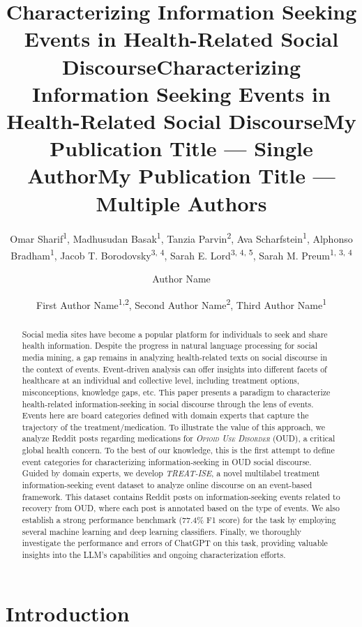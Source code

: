 \documentclass[letterpaper]{article} %
\title{Characterizing Information Seeking Events in Health-Related Social Discourse}
\title{Characterizing Information Seeking Events in Health-Related Social Discourse}
\author {
    Omar Sharif\textsuperscript{\rm 1},
    Madhusudan Basak\textsuperscript{\rm1},
    Tanzia Parvin\textsuperscript{\rm 2},
    Ava Scharfstein\textsuperscript{\rm 1},
    Alphonso Bradham\textsuperscript{\rm 1},
    Jacob T. Borodovsky\textsuperscript{\rm 3, \rm 4},
    Sarah E. Lord\textsuperscript{\rm 3, \rm 4, \rm 5},
    Sarah M. Preum\textsuperscript{\rm 1, \rm 3, \rm 4}
}
\title{My Publication Title --- Single Author}
\author {
    Author Name
}
\title{My Publication Title --- Multiple Authors}
\author {
    First Author Name\textsuperscript{\rm 1,\rm 2},
    Second Author Name\textsuperscript{\rm 2},
    Third Author Name\textsuperscript{\rm 1}
}
\begin{document}
\maketitle

\begin{abstract}
Social media sites have become a popular platform for individuals to seek and share health information. Despite the progress in natural language processing for social media mining, a gap remains in analyzing health-related texts on social discourse in the context of events. Event-driven analysis can offer insights into different facets of healthcare at an individual and collective level, including treatment options, misconceptions, knowledge gaps, etc. This paper presents a paradigm to characterize health-related information-seeking in social discourse through the lens of events. Events here are board categories defined with domain experts that capture the trajectory of the treatment/medication. To illustrate the value of this approach, we analyze Reddit posts regarding medications for \textit{\textsc{Opioid Use Disorder}} (OUD), a critical global health concern. To the best of our knowledge, this is the first attempt to define event categories for characterizing information-seeking in OUD social discourse. Guided by domain experts, we develop \textit{TREAT-ISE}, a novel multilabel treatment information-seeking event dataset to analyze online discourse on an event-based framework. This dataset contains Reddit posts on information-seeking events related to recovery from OUD, where each post is annotated based on the type of events. We also establish a strong performance benchmark (77.4\% F1 score) for the task by employing several machine learning and deep learning classifiers. Finally, we thoroughly investigate the performance and errors of ChatGPT on this task, providing valuable insights into the LLM's capabilities and ongoing characterization efforts.
\end{abstract}

\section{Introduction}
\end{document}
